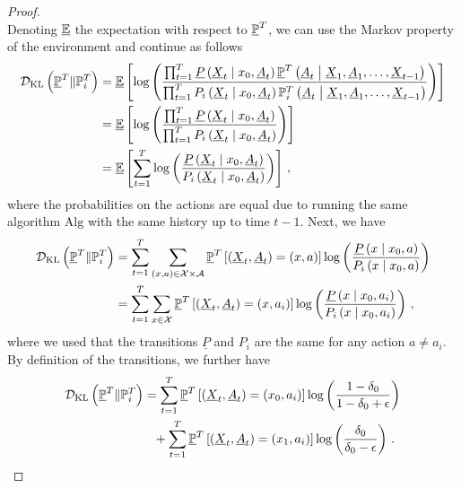 \begin{proof}
\begin{equation*}
    \end{equation*}
    Denoting $\underline{\mathbb{E}}$ the expectation with respect to $\underline{\mathbb{P}}^T$, we can use the Markov property of the environment and continue as follows
    \begin{align*}
        \mathcal{D}_{\text{KL}} \left( \underline{\mathbb{P}}^T \| \mathbb{P}_i^T \right) &= \underline{\mathbb{E}} \left[ \log \left( \frac{\prod_{t=1}^T \underline{P} \left( \underline{X}_t \mathrel{}\middle|\mathrel{} x_0, \underline{A}_t \right) \underline{\mathbb{P}}^T \left( \underline{A}_t \mathrel{}\middle|\mathrel{} \underline{X}_1, \underline{A}_1, \dots, \underline{X}_{t-1} \right)}{\prod_{t=1}^T P_i \left( \underline{X}_t \mathrel{}\middle|\mathrel{} x_0, \underline{A}_t \right) \mathbb{P}_i^T \left( \underline{A}_t \mathrel{}\middle|\mathrel{} \underline{X}_1, \underline{A}_1, \dots, \underline{X}_{t-1} \right)} \right) \right] \\
        &= \underline{\mathbb{E}} \left[ \log \left( \frac{\prod_{t=1}^T \underline{P} \left( \underline{X}_t \mathrel{}\middle|\mathrel{} x_0, \underline{A}_t \right)}{\prod_{t=1}^T P_i \left( \underline{X}_t \mathrel{}\middle|\mathrel{} x_0, \underline{A}_t \right)} \right) \right] \\
        &= \underline{\mathbb{E}} \left[ \sum_{t=1}^T \log \left( \frac{\underline{P} \left( \underline{X}_t \mathrel{}\middle|\mathrel{} x_0, \underline{A}_t \right)}{P_i \left( \underline{X}_t \mathrel{}\middle|\mathrel{} x_0, \underline{A}_t \right)} \right) \right]\,,
    \end{align*}
    where the probabilities on the actions are equal due to running the same algorithm $\mathrm{Alg}$ with the same history up to time $t-1$. Next, we have
    \begin{align*}
        \mathcal{D}_{\text{KL}} \left( \underline{\mathbb{P}}^T \| \mathbb{P}_i^T \right) &= \sum_{t=1}^T \sum_{\left( x, a \right) \in \mathcal{X} \times \mathcal{A}} \underline{\mathbb{P}}^T \left[ \left( \underline{X}_t, \underline{A}_t \right) = \left( x, a \right) \right] \log \left( \frac{\underline{P} \left( x \mathrel{}\middle|\mathrel{} x_0, a \right)}{P_i \left( x \mathrel{}\middle|\mathrel{} x_0, a \right)} \right) \\
        &= \sum_{t=1}^T \sum_{x \in \mathcal{X}} \underline{\mathbb{P}}^T \left[ \left( \underline{X}_t, \underline{A}_t \right) = \left( x, a_i \right) \right] \log \left( \frac{\underline{P} \left( x \mathrel{}\middle|\mathrel{} x_0, a_i \right)}{P_i \left( x \mathrel{}\middle|\mathrel{} x_0, a_i \right)} \right)\,,
    \end{align*}
    where we used that the transitions $\underline{P}$ and $P_i$ are the same for any action $a \neq a_i$. By definition of the transitions, we further have
    \begin{align*}
        \KL \spr{\underline{\bbP}^T \| \bbP_i^T} &= \sumtT \underline{\bbP}^T \sbr{\spr{\underline{X}_t, \underline{A}_t} = \spr{x_0, a_i}}  \log \spr{\frac{1 - \delta_0}{1 - \delta_0 + \epsilon}} \\
        &\phantom{=}+ \sumtT \underline{\bbP}^T \sbr{\spr{\underline{X}_t, \underline{A}_t} = \spr{x_1, a_i}} \log \spr{\frac{\delta_0}{\delta_0 - \epsilon}}\,.

\end{align*}
\end{proof}
